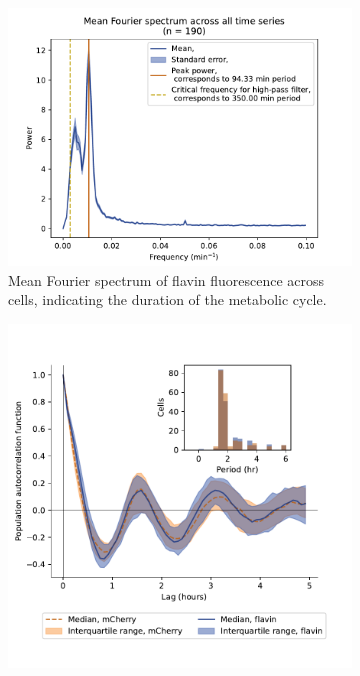 \begin{figure}
  \begin{subfigure}[htpb]{0.4\textwidth}
   \centering
   \includegraphics[width=\textwidth]{htb2mCherry_26643_14}
   \caption{
    Mean Fourier spectrum of flavin fluorescence across cells, indicating the duration of the metabolic cycle.
   }
   \label{fig:biology-highglc-sync-fourier}
  \end{subfigure}%
  \begin{subfigure}[htpb]{0.4\textwidth}
   \centering
   \includegraphics[width=\textwidth]{htb2mCherry_26643_12}

\end{subfigure}
\end{figure}
